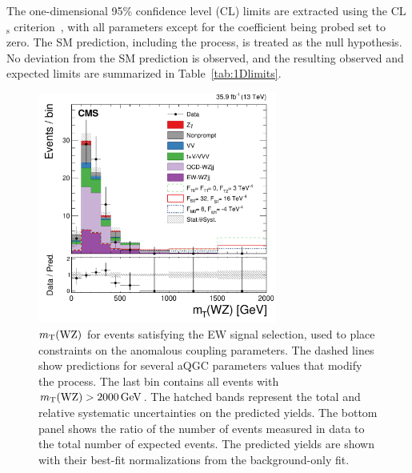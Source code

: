 The one-dimensional 95\% confidence level (CL) limits are extracted 
using the CL$\mathrm{_s}$ criterion~\cite{Junk:1999kv,CLS2,Cowan:2010js}, with all parameters
except for the coefficient being probed set to zero.
The SM prediction, including the \EWWZ process, is treated as the null hypothesis.
No deviation from the SM prediction is observed, 
and the resulting observed and expected limits are summarized in Table~\ref{tab:1Dlimits}. 

\begin{figure}[htbp]
  \centering
    \includegraphics[width=0.7\textwidth]{figures/AnalysisResults/MTWZ_aQGC.pdf}
  \caption{
      $m_{\mathrm{T}}(\mathrm{W}\mathrm{Z})$ for events satisfying the EW signal selection,
      used to place constraints on the anomalous coupling parameters.
      The dashed lines show predictions for several aQGC parameters values that modify the \EWWZ process.
      The last bin contains all events with $m_{\mathrm{T}}(\mathrm{W}\mathrm{Z}) > 2000\,\text{Ge\hspace{-.08em}V}$.
      The hatched bands represent the total and relative 
      systematic uncertainties on the predicted yields.
      The bottom panel shows the ratio of the number of events measured in data to the total 
      number of expected events. 
      The predicted yields are shown with their best-fit normalizations from the background-only fit.
      }
 \label{fig:aQGCDistribution}
\end{figure}

